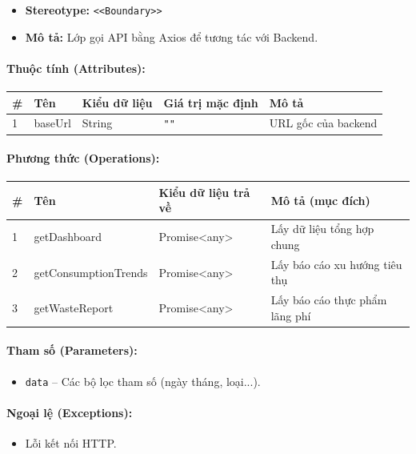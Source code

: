 \documentclass[12pt,a4paper]{article}
\begin{document}
\begin{itemize}[leftmargin=*]
    \item \textbf{Stereotype:} \texttt{\textless{}\textless{}Boundary\textgreater{}\textgreater{}}
    \item \textbf{Mô tả:} Lớp gọi API bằng Axios để tương tác với Backend.
\end{itemize}

\paragraph{Thuộc tính (Attributes):}
\begin{longtable}{|p{0.6cm}|p{3.5cm}|p{2.4cm}|p{1.8cm}|p{5.1cm}|}
\hline
\textbf{\#} & \textbf{Tên} & \textbf{Kiểu dữ liệu} & \textbf{Giá trị mặc định} & \textbf{Mô tả} \\ \hline
\endhead
1 & baseUrl & String & \texttt{""} & URL gốc của backend \\ \hline
\end{longtable}

\paragraph{Phương thức (Operations):}
\begin{longtable}{|p{0.6cm}|p{5.0cm}|p{2.8cm}|p{5.4cm}|}
\hline
\textbf{\#} & \textbf{Tên} & \textbf{Kiểu dữ liệu trả về} & \textbf{Mô tả (mục đích)} \\ \hline
\endhead
1 & getDashboard & Promise\textless{}any\textgreater{} & Lấy dữ liệu tổng hợp chung \\ \hline
2 & getConsumptionTrends & Promise\textless{}any\textgreater{} & Lấy báo cáo xu hướng tiêu thụ \\ \hline
3 & getWasteReport & Promise\textless{}any\textgreater{} & Lấy báo cáo thực phẩm lãng phí \\ \hline
\end{longtable}

\paragraph{Tham số (Parameters):}
\begin{itemize}[leftmargin=*]
    \item \texttt{data} – Các bộ lọc tham số (ngày tháng, loại...).
\end{itemize}


\paragraph{Ngoại lệ (Exceptions):}
\begin{itemize}[leftmargin=*]
    \item Lỗi kết nối HTTP.
\end{itemize}
\end{document}
